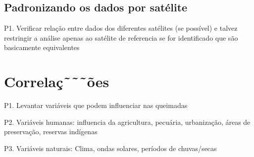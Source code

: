 \documentclass[cic,tc]{iiufrgs}
\begin{document}
\section{Padronizando os dados por satélite}

P1. Verificar relação entre dados dos diferentes satélites (se possível) e talvez restringir a análise apenas ao satélite de referencia se for identificado que são basicamente equivalentes \par

\chapter{Correlaç˜˜˜ões}

P1. Levantar variáveis que podem influenciar nas queimadas \par
P2. Variáveis humanas: influencia da agricultura, pecuária, 
urbanização, áreas de preservação, reservas indígenas \par
P3. Variáveis naturais: Clima, ondas solares, períodos de chuvas/secas \par





\end{document}
